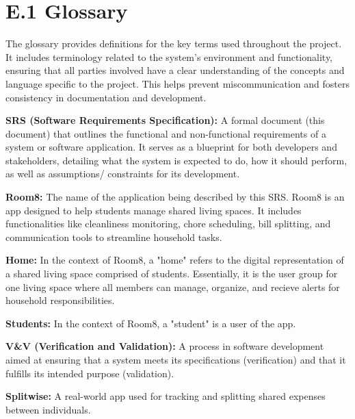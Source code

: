 \documentclass{scrreprt}
\newcommand*{\nsection}[1]{
    \section*{#1}
    \addcontentsline{toc}{section}{#1}
}
\theoremstyle{definition}
\begin{document}
\nsection{E.1 Glossary}
The glossary provides definitions for the key terms used throughout the project. It includes terminology related to the system’s environment and functionality, ensuring that all parties involved have a clear understanding of the concepts and language specific to the project. This helps prevent miscommunication and fosters consistency in documentation and development.
\begin{flushleft}
    \item \textbf{SRS (Software Requirements Specification):} A formal document (this document) that outlines the functional and non-functional requirements of a system or software application. It serves as a blueprint for both developers and stakeholders, detailing what the system is expected to do, how it should perform, as well as assumptions/ constraints for its development.\newline

    \item \textbf{Room8:} The name of the application being described by this SRS. Room8 is an app designed to help students manage shared living spaces. It includes functionalities like cleanliness monitoring, chore scheduling, bill splitting, and communication tools to streamline household tasks.\newline

    \item \textbf{Home:} In the context of Room8, a "home" refers to the digital representation of a shared living space comprised of students. Essentially, it is the user group for one living space where all members can manage, organize, and recieve alerts for household responsibilities.\newline

    \item \textbf{Students:} In the context of Room8, a "student" is a user of the app. \newline

    \item \textbf{V\&V (Verification and Validation):} A process in software development aimed at ensuring that a system meets its specifications (verification) and that it fulfills its intended purpose (validation).\newline

    \item \textbf{Splitwise:} A real-world app used for tracking and splitting shared expenses between individuals.\newline


\end{flushleft}
\end{document}
